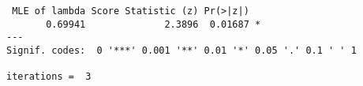 \begin{verbatim} MLE of lambda Score Statistic (z) Pr(>|z|)  
       0.69941              2.3896  0.01687 *
---
Signif. codes:  0 '***' 0.001 '**' 0.01 '*' 0.05 '.' 0.1 ' ' 1

iterations =  3 
\end{verbatim}